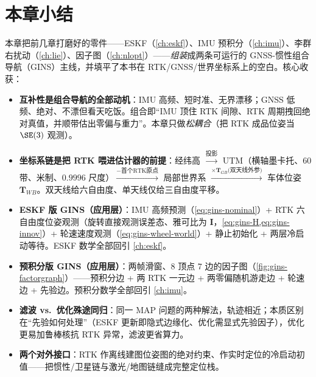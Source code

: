\section*{本章小结}

本章把前几章打磨好的零件——ESKF（\cref{ch:eskf}）、IMU 预积分（\cref{ch:imu}）、李群右扰动（\cref{ch:lie}）、因子图（\cref{ch:nlopt}）——\emph{组装}成两条可运行的 GNSS-惯性组合导航（GINS）主线，并填平了本书在 RTK/GNSS/世界坐标系上的空白。核心收获：

\begin{itemize}
  \item \textbf{互补性是组合导航的全部动机}：IMU 高频、短时准、无界漂移；GNSS 低频、绝对、不漂但看天吃饭。组合即“IMU 顶住 RTK 间隙、RTK 周期拽回绝对真值，并顺带估出零偏与重力”。本章只做\emph{松耦合}（把 RTK 成品位姿当 $\SE(3)$ 观测）。
  \item \textbf{坐标系链是把 RTK 喂进估计器的前提}：经纬高 $\xrightarrow{\text{投影}}$ UTM（横轴墨卡托、$60$ 带、米制、$0.9996$ 尺度）$\xrightarrow{-\text{首个RTK原点}}$ 局部世界系 $\xrightarrow{\times\mathbf{T}_{GB}\text{(双天线外参)}}$ 车体位姿 $\mathbf{T}_{WB}$。双天线给六自由度、单天线仅给三自由度平移。
  \item \textbf{ESKF 版 GINS（应用层）}：IMU 高频预测（\cref{eq:gins-nominal}）+ RTK 六自由度位姿观测（旋转直接观测误差态、雅可比为 $\mathbf{I}$，\cref{eq:gins-H,eq:gins-innov}）+ 轮速速度观测（\cref{eq:gins-wheel-world}）+ 静止初始化 + 两层冷启动等待。ESKF 数学全部回引 \cref{ch:eskf}。
  \item \textbf{预积分版 GINS（应用层）}：两帧滑窗、$8$ 顶点 $7$ 边的因子图（\cref{fig:gins-factorgraph}）——预积分边 + 两 RTK 一元边 + 两零偏随机游走边 + 轮速边 + 先验边。预积分数学全部回引 \cref{ch:imu}。
  \item \textbf{滤波 vs.\ 优化殊途同归}：同一 MAP 问题的两种解法，轨迹相近；本质区别在“先验如何处理”（ESKF 更新即隐式边缘化、优化需显式先验因子），优化更易加鲁棒核抗 RTK 异常，滤波更省算力。
  \item \textbf{两个对外接口}：RTK 作离线建图位姿图的绝对约束、作实时定位的冷启动初值——把惯性/卫星链与激光/地图链缝成完整定位栈。
\end{itemize}

